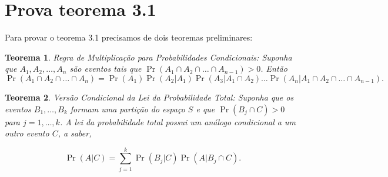 \documentclass[12pt, a4paper, openany]{book}
\numberwithin{equation}{chapter}
\numberwithin{table}{chapter}
\numberwithin{figure}{chapter}
\theoremstyle{break}
\newtheorem{theorem}{Teorema}[section]
\begin{document}
\section{Prova teorema 3.1}

Para provar o teorema 3.1 precisamos de dois teoremas preliminares:


\begin{theorem}  Regra de Multiplicação para Probabilidades Condicionais:
Suponha que \( A_1, A_2, \dots, A_n \) são eventos tais que \( \Pr(A_1 \cap A_2 \cap \dots \cap A_{n-1}) > 0 \). Então
\[
\Pr(A_1 \cap A_2 \cap \dots \cap A_n) = \Pr(A_1) \Pr(A_2 | A_1) \Pr(A_3 | A_1 \cap A_2) \dots \Pr(A_n | A_1 \cap A_2 \cap \dots \cap A_{n-1}).
\]
\end{theorem}


\begin{theorem}
    Versão Condicional da Lei da Probabilidade Total: Suponha que os eventos \( B_1, \dots, B_k \) formam uma partição do espaço \( S \) e que \( \Pr(B_j \cap C) > 0 \) para \( j = 1, \dots, k \). A lei da probabilidade total possui um análogo condicional a um outro evento \( C \), a saber,

\[
\Pr(A | C) = \sum_{j=1}^{k} \Pr(B_j | C) \Pr(A | B_j \cap C).
\]
\end{theorem}









\end{document}
